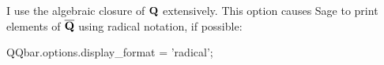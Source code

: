 I use the algebraic closure of ${\bf Q}$ extensively.  This
option causes Sage to print elements of $\overline{\bf Q}$
using radical notation, if possible:

\begin{sagecommon}
QQbar.options.display_format = 'radical';
\end{sagecommon}

\begin{comment}

Here I will present another proof, Gauss's second method (cast into
modern terms by van der Waerden).  Not only is it more algebraic
in its flavor, but it is in fact a slightly stronger result.

Starting with unordered rings and fields, we introduce the concept of
{\it ordered} rings and fields field, where every element can be
compared to zero consistently with the axioms:

\begin{center}
\begin{supertabular}{l l l r}
   total order	& $\forall a,$ & one of $a<0, a=0, a>0$ holds &(O1)\cr
   consistency with negation & $\forall a,$ & one of $-a>0, a=0, a>0$ holds &(O1)\cr
   consistency with addition & $\forall a,b$ & $a>0 \cap b>0 \implies a+b>0$ &(O2)\cr
   consistency with multiplication & $\forall a,b$ & $a>0 \cap b>0 \implies ab>0$ &(O3)\cr
\end{supertabular}
\end{center}

I've introduced new logic symbols $\cap$ for logical and $\implies$
for logical implication.  $\cup$ is used for logical or.  Note
particularly that O2 implies that $n \cdot 1$ is always positive, never
zero, so our field characteristic is always zero.  No finite field can
be ordered.  This implies that our prime subfield is always ${\bf Q}$.
O3 implies that squares must be positive.

We further classify an ordered field as {\it Archemedian} if it
satisfies:

\begin{center}
\begin{supertabular}{l l @{} l r}
   Archemedian property	& $\forall a,$ & $\exists b \in {\bf Q}, b>a$ &(A1)\cr
\end{supertabular}
\end{center}

Non-Archemdian fields have ``infinitely large'' and ``infinitely
small'' numbers, larger and smaller than any rational number, and
${\bf Q}$ is confined to a narrow region of the field.  We will not
comsider such fields.


\end{comment}

